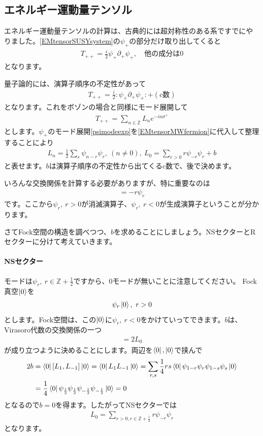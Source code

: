 \documentclass[report,paper=a4, fontsize=12pt, line_length=16cm, number_of_lines=34,dvipdfmx]{jlreq}
\numberwithin{equation}{chapter}
\numberwithin{equation}{section}
\newcommand{\Zb}{\mathbb{Z}}
\newcommand{\del}{\partial}
\begin{document}
\subsection{エネルギー運動量テンソル}
エネルギー運動量テンソルの計算は、古典的には超対称性のある系ですでにやりました。\eqref{EMtensorSUSYsystem}の$\psi_{+}$の部分だけ取り出してくると
\begin{align}
  T_{++}=\frac{i}{2} \psi_{+}\del_{+}\psi_{+},\quad \text{他の成分は0}
\end{align}
となります。

量子論的には、演算子順序の不定性があって
\begin{align}
  T_{++}=\frac{i}{2}:\psi_{+}\del_{+}\psi_{+}:+(\text{c数})\label{EMtensorMWfermion}
\end{align}
となります。これをボゾンの場合と同様にモード展開して
\begin{align}
  T_{++}=\sum_{n\in\Zb}L_{n}e^{-in\sigma^{+}}
\end{align}
とします。$\psi_{+}$のモード展開\eqref{psimodeexp}を\eqref{EMtensorMWfermion}に代入して整理することにより
\begin{align}
  L_{n}=\frac{1}{2}\sum_{r}\psi_{n-r}\psi_{r},\ (n\ne 0),\ 
  L_0=\sum_{r>0}r\psi_{-r}\psi_{r}+b
\end{align}
と表せます。$b$は演算子順序の不定性から出てくるc数で、後で決めます。

いろんな交換関係を計算する必要がありますが、特に重要なのは
\begin{align}
  [L_0,\psi_r]=-r\psi_{r}
\end{align}
です。ここから$\psi_{r},\ r>0$が消滅演算子、$\psi_{r},\ r<0$が生成演算子ということが分かります。

さてFock空間の構造を調べつつ、$b$を求めることにしましょう。NSセクターとRセクターに分けて考えていきます。

\paragraph{NSセクター}
モードは$\psi_{r},\ r\in \Zb+\frac12$ですから、0モードが無いことに注意してください。
Fock真空$\ket{0}$を
\begin{align}
  \psi_{r}\ket{0},\ r>0
\end{align}
とします。Fock空間は、この$\ket{0}$に$\psi_{r},\ r<0$をかけていってできます。$b$は、Virasoro代数の交換関係の一つ
\begin{align}
  [L_{1},L_{-1}]=2L_{0}
\end{align}
が成り立つように決めることにします。両辺を$\bra{0},\ket{0}$で挟んで
\begin{align}
  2b
  &=\bra{0}[L_{1},L_{-1}]\ket{0}
  =\bra{0}L_{1}L_{-1}\ket{0}
  =\sum_{r,s}\frac14rs\bra{0}\psi_{1-r}\psi_{r}\psi_{1-s}\psi_{s}\ket{0}\nonumber\\
  &=\frac14 \bra{0}\psi_{\frac12}\psi_{\frac12}\psi_{-\frac12}\psi_{-\frac12}\ket{0}=0
\end{align}
となるので$b=0$を得ます。したがってNSセクターでは
\begin{align}
  L_0=\sum_{r>0,r\in \Zb+\frac12} r\psi_{-r}\psi_{r}
\end{align}
となります。
\end{document}
